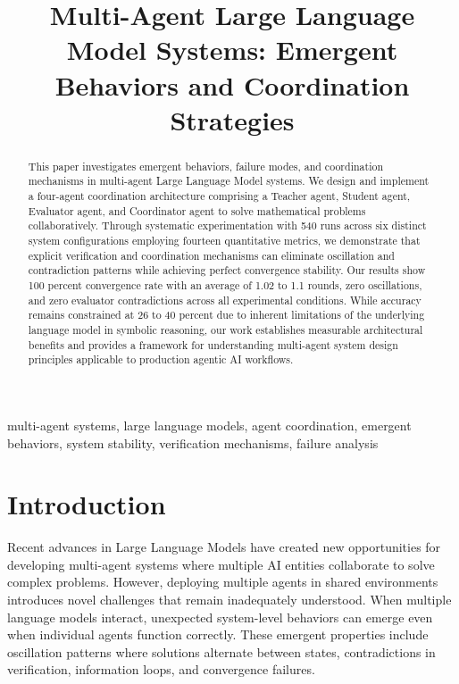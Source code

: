 \documentclass[conference]{IEEEtran}
\title{Multi-Agent Large Language Model Systems: Emergent Behaviors and Coordination Strategies}
\author{\IEEEauthorblockN{Research Team}
\IEEEauthorblockA{Department of Computer Science\\
Agentic AI Course\\
May 2026}}
\begin{document}
\maketitle

\begin{abstract}
This paper investigates emergent behaviors, failure modes, and coordination mechanisms in multi-agent Large Language Model systems. We design and implement a four-agent coordination architecture comprising a Teacher agent, Student agent, Evaluator agent, and Coordinator agent to solve mathematical problems collaboratively. Through systematic experimentation with 540 runs across six distinct system configurations employing fourteen quantitative metrics, we demonstrate that explicit verification and coordination mechanisms can eliminate oscillation and contradiction patterns while achieving perfect convergence stability. Our results show 100 percent convergence rate with an average of 1.02 to 1.1 rounds, zero oscillations, and zero evaluator contradictions across all experimental conditions. While accuracy remains constrained at 26 to 40 percent due to inherent limitations of the underlying language model in symbolic reasoning, our work establishes measurable architectural benefits and provides a framework for understanding multi-agent system design principles applicable to production agentic AI workflows.
\end{abstract}

\begin{IEEEkeywords}
multi-agent systems, large language models, agent coordination, emergent behaviors, system stability, verification mechanisms, failure analysis
\end{IEEEkeywords}

\section{Introduction}

Recent advances in Large Language Models have created new opportunities for developing multi-agent systems where multiple AI entities collaborate to solve complex problems. However, deploying multiple agents in shared environments introduces novel challenges that remain inadequately understood. When multiple language models interact, unexpected system-level behaviors can emerge even when individual agents function correctly. These emergent properties include oscillation patterns where solutions alternate between states, contradictions in verification, information loops, and convergence failures.
\end{document}
